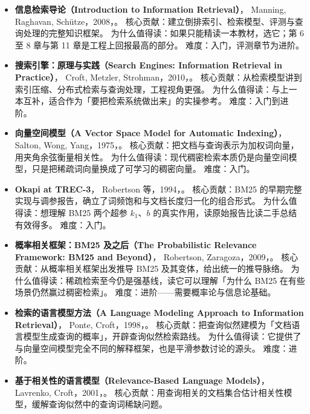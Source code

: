 \begin{itemize}
  \item \textbf{信息检索导论（Introduction to Information Retrieval）}，
        Manning, Raghavan, Sch\"utze，2008，\cite{manning2008ir}。
        核心贡献：建立倒排索引、检索模型、评测与查询处理的完整知识框架。
        为什么值得读：如果只能精读一本教材，选它；第 6 至 8 章与第 11 章是工程上回报最高的部分。
        难度：入门，评测章节为进阶。
  \item \textbf{搜索引擎：原理与实践（Search Engines: Information Retrieval in Practice）}，
        Croft, Metzler, Strohman，2010，\cite{croft2010search}。
        核心贡献：从检索模型讲到索引压缩、分布式检索与查询处理，工程视角更强。
        为什么值得读：与上一本互补，适合作为「要把检索系统做出来」的实操参考。
        难度：入门到进阶。
  \item \textbf{向量空间模型（A Vector Space Model for Automatic Indexing）}，
        Salton, Wong, Yang，1975，\cite{salton1975vsm}。
        核心贡献：把文档与查询表示为加权词向量，用夹角余弦衡量相关性。
        为什么值得读：现代稠密检索本质仍是向量空间模型，只是把稀疏词向量换成了可学习的稠密向量。
        难度：入门。
  \item \textbf{Okapi at TREC-3}，
        Robertson 等，1994，\cite{robertson1994okapi}。
        核心贡献：BM25 的早期完整实现与调参报告，确立了词频饱和与文档长度归一化的组合形式。
        为什么值得读：想理解 BM25 两个超参 $k_1$、$b$ 的真实作用，读原始报告比读二手总结有效得多。
        难度：入门。
  \item \textbf{概率相关框架：BM25 及之后（The Probabilistic Relevance Framework: BM25 and Beyond）}，
        Robertson, Zaragoza，2009，\cite{robertson2009bm25}。
        核心贡献：从概率相关框架出发推导 BM25 及其变体，给出统一的推导脉络。
        为什么值得读：稀疏检索至今仍是强基线，读它可以理解「为什么 BM25 在有些场景仍然赢过稠密检索」。
        难度：进阶——需要概率论与信息论基础。
  \item \textbf{检索的语言模型方法（A Language Modeling Approach to Information Retrieval）}，
        Ponte, Croft，1998，\cite{ponte1998ql}。
        核心贡献：把查询似然建模为「文档语言模型生成查询的概率」，开辟查询似然检索路线。
        为什么值得读：它提供了与向量空间模型完全不同的解释框架，也是平滑参数讨论的源头。
        难度：进阶。
  \item \textbf{基于相关性的语言模型（Relevance-Based Language Models）}，
        Lavrenko, Croft，2001，\cite{lavrenko2001rm}。
        核心贡献：用查询相关的文档集合估计相关性模型，缓解查询似然中的查询词稀缺问题。

\end{itemize}
